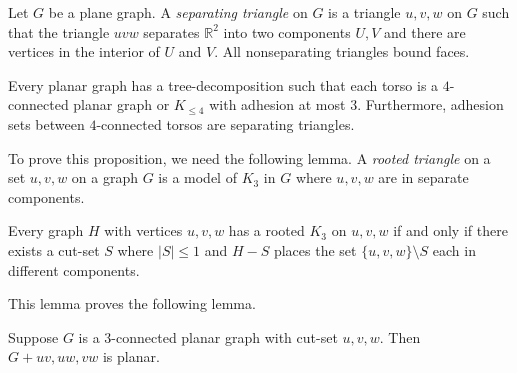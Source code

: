 Let $G$ be a plane graph. A \textit{separating triangle} on $G$ is a triangle $u,v,w$ on $G$ such that the triangle $uvw$ separates $\mathbb{R}^2$ into two components $U, V$ and there are vertices in the interior of $U$ and $V$. All nonseparating triangles bound faces. 

\begin{proposition}\label{lem:planar_graphs_4_connected_cliqesums}
	Every planar graph has a tree-decomposition such that each torso is a \(4\)-connected planar graph or $K_{\leq 4}$ with adhesion at most \(3\). Furthermore, adhesion sets between $4$-connected torsos are separating triangles.
\end{proposition}

To prove this proposition, we need the following lemma. A \textit{rooted triangle} on a set $u, v, w$ on a graph $G$ is a model of $K_3$ in $G$ where $u, v, w$ are in separate components. 

\begin{lemma}\label{lem:rooted_triangle}
	Every graph $H$ with vertices $u, v, w$ has a rooted $K_3$ on $u, v, w$ if and only if there exists a cut-set $S$ where $|S| \leq 1$ and $H - S$ places the set $\{u,v,w\} \setminus S$ each in different components. 
\end{lemma}

This lemma proves the following lemma.

\begin{lemma}\label{thm:cutset_added_edges}
	Suppose $G$ is a $3$-connected planar graph with cut-set $u,v,w$. Then $G + uv, uw, vw$ is planar. 
\end{lemma}

